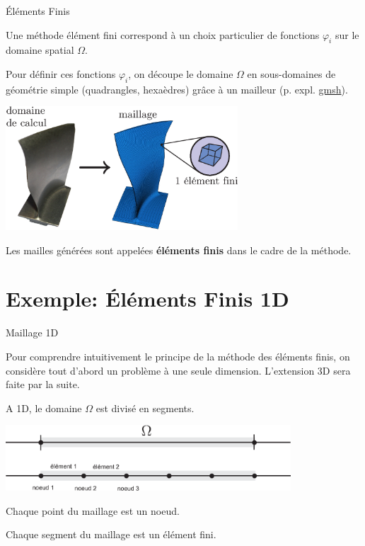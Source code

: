 \documentclass[
mode=present,    %
paper=a4paper,   %
orient=landscape,
display=slides,   %
size=10pt,     %
style=romain   %
]{powerdot}
\begin{document}
\begin{slide}{Éléments Finis}

Une méthode élément fini correspond à un choix particulier de fonctions $\varphi_i$ sur le domaine spatial $\Omega$.

\bigskip

Pour définir ces fonctions $\varphi_i$, on découpe le domaine $\Omega$ en sous-domaines de géométrie simple (quadrangles, hexaèdres) grâce à un mailleur (p. expl. \href{http://geuz.org/gmsh/}{gmsh}).

    \centerline{\includegraphics[width=0.65\textwidth]{blade.eps} }

Les mailles générées sont appelées \textbf{éléments finis} dans le cadre de la méthode.

\end{slide}

\section[toc=Exemple: EF 1D]{Exemple: Éléments Finis 1D}


\begin{slide}{Maillage 1D}

Pour comprendre intuitivement le principe de la méthode des éléments finis, on considère tout d'abord un problème à une seule dimension. L'extension 3D sera faite par la suite.
\bigskip

A 1D, le domaine $\Omega$ est divisé en segments.

\bigskip

    \centerline{\includegraphics[width=0.8\textwidth]{mesh1d.eps} }

\bigskip

Chaque point du maillage est un noeud.

Chaque segment du maillage est un élément fini.

\end{slide}
\end{document}
